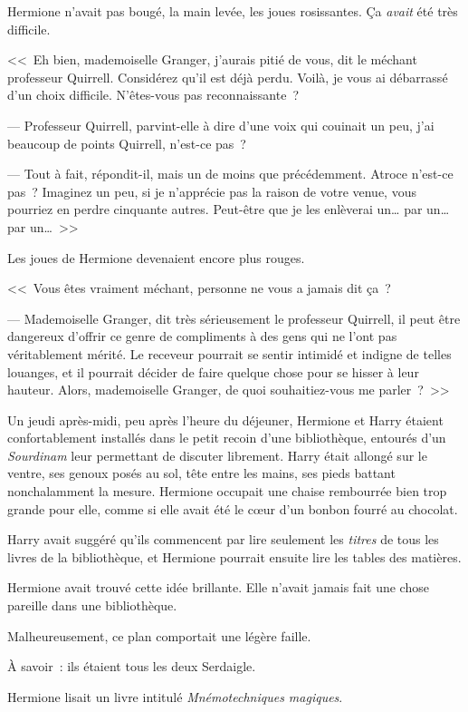 Hermione n'avait pas bougé, la main levée, les joues rosissantes. Ça \emph{avait} été très difficile.

<<~Eh bien, mademoiselle Granger, j'aurais pitié de vous, dit le méchant professeur Quirrell. Considérez qu'il est déjà perdu. Voilà, je vous ai débarrassé d'un choix difficile. N'êtes-vous pas reconnaissante~?

--- Professeur Quirrell, parvint-elle à dire d'une voix qui couinait un peu, j'ai beaucoup de points Quirrell, n'est-ce pas~?

--- Tout à fait, répondit-il, mais un de moins que précédemment. Atroce n'est-ce pas~? Imaginez un peu, si je n'apprécie pas la raison de votre venue, vous pourriez en perdre cinquante autres. Peut-être que je les enlèverai un… par un… par un…~>>

Les joues de Hermione devenaient encore plus rouges.

<<~Vous êtes vraiment méchant, personne ne vous a jamais dit ça~?

--- Mademoiselle Granger, dit très sérieusement le professeur Quirrell, il peut être dangereux d'offrir ce genre de compliments à des gens qui ne l'ont pas véritablement mérité. Le receveur pourrait se sentir intimidé et indigne de telles louanges, et il pourrait décider de faire quelque chose pour se hisser à leur hauteur. Alors, mademoiselle Granger, de quoi souhaitiez-vous me parler~?~>>

\later

Un jeudi après-midi, peu après l'heure du déjeuner, Hermione et Harry étaient confortablement installés dans le petit recoin d'une bibliothèque, entourés d'un \emph{Sourdinam} leur permettant de discuter librement. Harry était allongé sur le ventre, ses genoux posés au sol, tête entre les mains, ses pieds battant nonchalamment la mesure. Hermione occupait une chaise rembourrée bien trop grande pour elle, comme si elle avait été le cœur d'un bonbon fourré au chocolat.

Harry avait suggéré qu'ils commencent par lire seulement les \emph{titres} de tous les livres de la bibliothèque, et Hermione pourrait ensuite lire les tables des matières.

Hermione avait trouvé cette idée brillante. Elle n'avait jamais fait une chose pareille dans une bibliothèque.

Malheureusement, ce plan comportait une légère faille.

À savoir~: ils étaient tous les deux Serdaigle.

Hermione lisait un livre intitulé \emph{Mnémotechniques magiques}.

